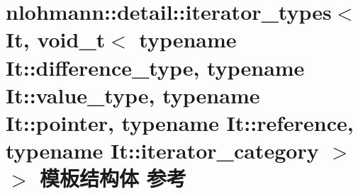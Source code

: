 \hypertarget{structnlohmann_1_1detail_1_1iterator__types_3_01_it_00_01void__t_3_01typename_01_it_1_1differenc4a413e9bd546446175f10f15c5631361}{}\section{nlohmann\+::detail\+::iterator\+\_\+types$<$ It, void\+\_\+t$<$ typename It\+::difference\+\_\+type, typename It\+::value\+\_\+type, typename It\+::pointer, typename It\+::reference, typename It\+::iterator\+\_\+category $>$ $>$ 模板结构体 参考}
\label{structnlohmann_1_1detail_1_1iterator__types_3_01_it_00_01void__t_3_01typename_01_it_1_1differenc4a413e9bd546446175f10f15c5631361}
